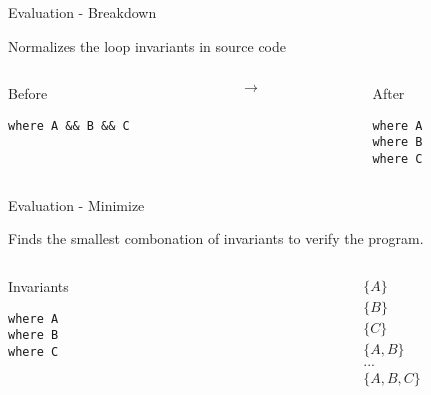 \begin{frame}[fragile]{Evaluation - Breakdown}

Normalizes the loop invariants in source code

\begin{columns}
\begin{column}{0.4\textwidth}
\begin{block}{Before}
\begin{verbatim}
where A && B && C
\end{verbatim}
\end{block}
\end{column}
\begin{column}{0.1\textwidth}
$\rightarrow$
\end{column}
\begin{column}{0.4\textwidth}
\begin{block}{After}
\begin{verbatim}
where A
where B
where C
\end{verbatim}
\end{block}
\end{column}
\end{columns}

\end{frame}



\begin{frame}[fragile]{Evaluation - Minimize}

Finds the smallest combonation of invariants to verify
the program.

\begin{columns}
\begin{column}{0.4\textwidth}
\begin{block}{Invariants}
\begin{verbatim}
where A
where B
where C
\end{verbatim}
\end{block}
\end{column}
\begin{column}{0.4\textwidth}
\begin{align*}
    &\{ A \} \\
    &\{ B \} \\
    &\{ C \} \\
    &\{ A, B \} \\
    &... \\
    &\{ A, B, C \} \\
\end{align*}
\end{column}
\end{columns}

\end{frame}

